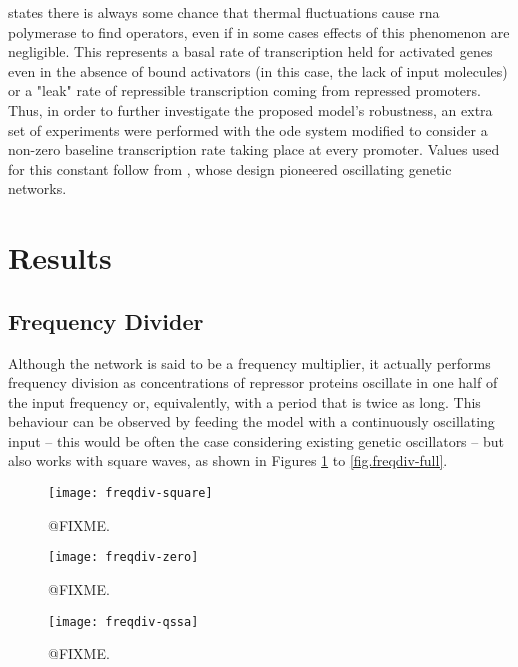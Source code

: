   \citet{ingalls} states there is always some chance that thermal fluctuations cause \acs{rna} polymerase to find operators, even if in some cases effects of this phenomenon are negligible.
  This represents a basal rate of transcription held for activated genes even in the absence of bound activators (in this case, the lack of input molecules) or a "leak" rate of repressible transcription coming from repressed promoters.
  Thus, in order to further investigate the proposed model's robustness, an extra set of experiments were performed with the \ac{ode} system modified to consider a non-zero baseline transcription rate taking place at every promoter.
  Values used for this constant follow from \citet{repressilator}, whose design pioneered oscillating genetic networks.


\section{Results}

  \subsection{Frequency Divider}

    Although the network is said to be a frequency multiplier, it actually performs frequency division as concentrations of repressor proteins oscillate in one half of the input frequency or, equivalently, with a period that is twice as long.
    This behaviour can be observed by feeding the model with a continuously oscillating input -- this would be often the case considering existing genetic oscillators -- but also works with square waves, as shown in Figures \ref{fig.freqdiv-square} to \ref{fig.freqdiv-full}.

    \begin{figure}[!htbp]
      \centering
      \texttt{[image: freqdiv-square]}
      \caption{@FIXME.}
      \label{fig.freqdiv-square}
    \end{figure}

    \begin{figure}[!htbp]
      \centering
      \texttt{[image: freqdiv-zero]}
      \caption{@FIXME.}
      \label{fig.freqdiv-zero}
    \end{figure}

    \begin{figure}[!htbp]
      \centering
      \texttt{[image: freqdiv-qssa]}
      \caption{@FIXME.}
      \label{fig.freqdiv-qssa}
    \end{figure}

